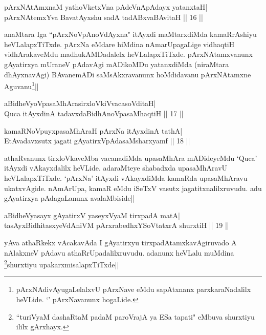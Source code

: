 \begin{shl}
pArxNAtAmxnaM yathoVketxVna pAdeVnA\s \s pAdayx yatanxtaH| \\
pArxNAtemxYva BavatAyxshu sadA tadABxvaBAvitaH \hfill ||  16 || 
\end{shl}

\begin{artha} 
anaMtara Iga ``pArxNoVpAnoVdAyxna" itAyxdi maMtarxdiMda kamaRrAshiyu 
heVLalapxTiTxde. pArxNa eMdare hiMdina nAmarUpagaLige vidhaqtiH 
vidhArakaveMdu madhukAMDadalelx heVLalapxTiTxde. 
pArxNAtamxvanunx gAyatirxya mUraneV pAdavAgi mADikoMDu yatanxdiMda 
(niraMtara dhAyxnavAgi) BAvanemADi saMsAkxravanunx hoMdidavanu 
pArxNAtamxne Aguvanu\footnote[1]{pArxNAdivAyugaLelalxvU pArxNave eMdu 
sapAtxnanx parxkaraNadalilx heVLide. `\stext' pArxNavanunx hogaLide.}||
\end{artha}


\begin{shl}
aBidheVyoVpasaMhArasirxloVkiVvacasoVditaH| \\
Quca itAyxdinA tadavxdaBidhAnoVpasaMhaqtiH \hfill ||  17 || 
\end{shl}

\begin{shl}
kamaRNoV\s puyxpasaMhAraH pArxNa itAyxdinA tathA| \\
EtAvadavxsutx jagati gAyatirxVpAdasaMsharxyamf \hfill ||  18 || 
\end{shl}

\begin{artha} 
athaRvanunx tirxloVkaveMba vacanadiMda upasaMhAra mADideyeMdu `Quca' 
itAyxdi vAkayxdalilx heVLide. adaraMteye shabadxda upasaMhAravU 
heVLalapxTiTxde. `pArxNa' itAyxdi vAkayxdiMda kamaRda upasaMhAravu 
ukatxvAgide. nAmArUpa, kamaR eMdu iSeTxV vasutx jagatitxnalilxruvudu. 
adu gAyatirxya pAdagaLanunx avalaMbiside||
\end{artha}


\begin{shl}
aBidheVyasayx gAyatirxV yaseyxVyaM tirxpadA matA| \\
tasAyxBidhitasxyeVdAniVM pArxrabedhxYSoVtatxrA shurxtiH \hfill ||  19 || 
\end{shl}

\begin{artha} 
yAva athaRkekx vAcakavAda I gAyatirxyu tirxpadAtamxkavAgiruvado A 
nAlakxneV pAdavu athaRrUpadalilxruvudu. adanunx heVLalu muMdina 
\footnote[1]{``turiVyaM dashaRtaM padaM paroVrajA ya ESa tapati" 
eMbuva shurxtiyu ililx gArxhayx.}shurxtiyu upakarxmisalapxTiTxde||
\end{artha}

